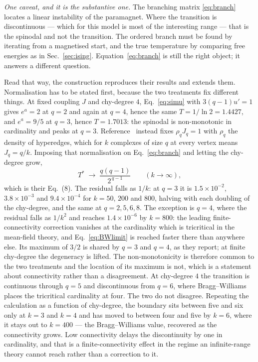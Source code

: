 \documentclass[aps,pre,twocolumn,superscriptaddress,floatfix]{revtex4-2}
\begin{document}
\emph{One caveat, and it is the substantive one.} The branching matrix
\eqref{eq:branch} locates a linear instability of the paramagnet. Where the
transition is discontinuous --- which for this model is most of the interesting
range --- that is the spinodal and not the transition. The ordered branch must
be found by iterating from a magnetised start, and the true temperature by
comparing free energies as in Sec.~\ref{sec:ising}. Equation~\eqref{eq:branch}
is still the right object; it answers a different question.

Read that way, the construction reproduces their results and extends them.
Normalisation has to be stated first, because the two treatments fix different
things. At fixed coupling $J$ and chy-degree $4$, Eq.~\eqref{eq:simu} with
$3(q-1)u'=1$ gives $e^{a}=2$ at $q=2$ and again at $q=4$, hence the same
$T=1/\ln2=1.4427$, and $e^{a}=9/5$ at $q=3$, hence $T=1.7013$: the spinodal is
non-monotonic in cardinality and peaks at $q=3$. Reference~\cite{SLG26} instead
fixes $\rho_qJ_q=1$ with $\rho_q$ the density of hyperedges, which for $k$
complexes of size $q$ at every vertex means $J_q=q/k$. Imposing that
normalisation on Eq.~\eqref{eq:branch} and letting the chy-degree grow,
\begin{equation}
  T^{\ast}\;\longrightarrow\;\frac{q(q-1)}{2^{\,q-1}}
  \qquad (k\to\infty),
  \label{eq:BWlimit}
\end{equation}
which is their Eq.~(8). The residual falls as $1/k$: at $q=3$ it is
$1.5\times10^{-2}$, $3.8\times10^{-3}$ and $9.4\times10^{-4}$ for $k=50$, $200$
and $800$, halving with each doubling of the chy-degree, and the same at
$q=2,5,6,8$. The exception is $q=4$, where the residual falls as $1/k^{2}$ and
reaches $1.4\times10^{-6}$ by $k=800$: the leading finite-connectivity
correction vanishes at the cardinality which is tricritical in the mean-field
theory, and Eq.~\eqref{eq:BWlimit} is reached faster there than anywhere else. Its maximum of $3/2$ is shared by $q=3$ and $q=4$, as they
report; at finite chy-degree the degeneracy is lifted. The non-monotonicity is
therefore common to the two treatments and the location of its maximum is not,
which is a statement about connectivity rather than a disagreement. At chy-degree $4$ the transition
is continuous through $q=5$ and discontinuous from $q=6$, where Bragg--Williams
places the tricritical cardinality at four. The two do not disagree. Repeating
the calculation as a function of chy-degree, the boundary sits between five and
six only at $k=3$ and $k=4$ and has moved to between four and five by $k=6$,
where it stays out to $k=400$ --- the Bragg--Williams value, recovered as the
connectivity grows. Low connectivity delays the discontinuity by one in
cardinality, and that is a finite-connectivity effect in the regime an
infinite-range theory cannot reach rather than a correction to it.
\end{document}

